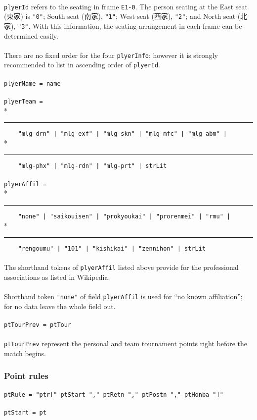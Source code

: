 \documentclass[%
	a4paper%
	,10pt%
	,twoside%
	,notitlepage%
]{article}%
\newcommand*{\ruleSymbol}{\textjapanese{⚠}}%
\newcommand*{\ruleMargin}{\marginpar{\flushright{}\ruleSymbol{}}}%
\newcommand*{\rulePar}{\paragraph*{\ruleMargin{}}}%
\newcommand*{\indentRule}{\rule{10pt}{0pt}}%
\begin{document}
			\paragraph*{}\lstinline/plyerId/ refers to the seating in frame \texttt{E1-0}. The person seating at the East seat (\textjapanese{東家}) is \lstinline/"0"/; South seat (\textjapanese{南家}), \lstinline/"1"/; West seat (\textjapanese{西家}), \lstinline/"2"/; and North seat (\textjapanese{北家}), \lstinline/"3"/. With this information, the seating arrangement in each frame can be determined easily. %
			\rulePar{}There are no fixed order for the four \lstinline/plyerInfo/; however it is strongly recommended to list in ascending order of \lstinline/plyerId/. %
			\rulePar{}\lstinline/plyerName = name/%
			\rulePar{}\lstinline/plyerTeam = /\\*%
			\indentRule{}\lstinline/    "mlg-drn" | "mlg-exf" | "mlg-skn" | "mlg-mfc" | "mlg-abm" | /\\*%
			\indentRule{}\lstinline/    "mlg-phx" | "mlg-rdn" | "mlg-prt" | strLit/%
			\rulePar{}\lstinline/plyerAffil = /\\*%
			\indentRule{}\lstinline/    "none" | "saikouisen" | "prokyoukai" | "prorenmei" | "rmu" | /\\*%
			\indentRule{}\lstinline/    "rengoumu" | "101" | "kishikai" | "zennihon" | strLit/%
			\paragraph*{}The shorthand tokens of \lstinline/plyerAffil/ listed above provide for the professional associations as listed in Wikipedia\cite{wiki-proassn}. %
			\rulePar{}Shorthand token \lstinline/"none"/ of field \lstinline/plyerAffil/ is used for ``no known affiliation''; for no data leave the whole field out. %
			\rulePar{}\lstinline/ptTourPrev = ptTour/%
			\paragraph*{}\lstinline/ptTourPrev/ represent the personal and team tournament points right before the match begins. %
		\subsubsection{Point rules}%
			\rulePar{}\lstinline/ptRule = "ptr[" ptStart "," ptRetn "," ptPostn "," ptHonba "]"/%
			\rulePar{}\lstinline/ptStart = pt/%
\end{document}
